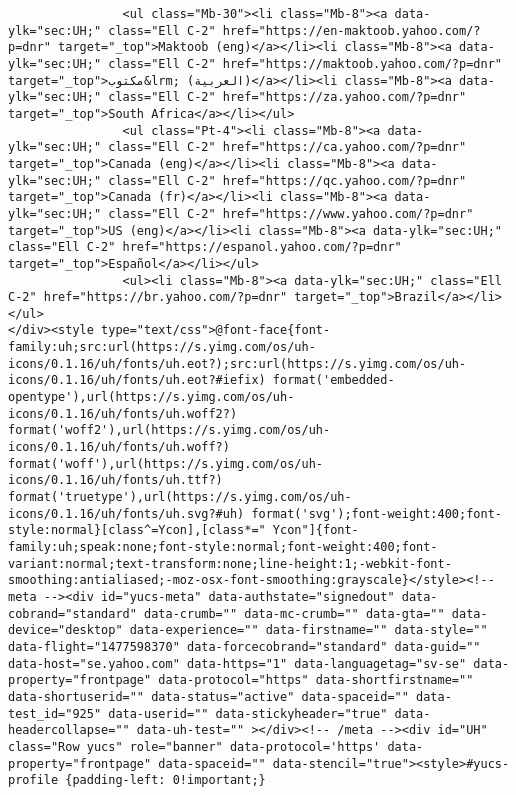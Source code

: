 \begin{verbatim}
                <ul class="Mb-30"><li class="Mb-8"><a data-ylk="sec:UH;" class="Ell C-2" href="https://en-maktoob.yahoo.com/?p=dnr" target="_top">Maktoob (eng)</a></li><li class="Mb-8"><a data-ylk="sec:UH;" class="Ell C-2" href="https://maktoob.yahoo.com/?p=dnr" target="_top">مكتوب&lrm; (العربية)</a></li><li class="Mb-8"><a data-ylk="sec:UH;" class="Ell C-2" href="https://za.yahoo.com/?p=dnr" target="_top">South Africa</a></li></ul>
                <ul class="Pt-4"><li class="Mb-8"><a data-ylk="sec:UH;" class="Ell C-2" href="https://ca.yahoo.com/?p=dnr" target="_top">Canada (eng)</a></li><li class="Mb-8"><a data-ylk="sec:UH;" class="Ell C-2" href="https://qc.yahoo.com/?p=dnr" target="_top">Canada (fr)</a></li><li class="Mb-8"><a data-ylk="sec:UH;" class="Ell C-2" href="https://www.yahoo.com/?p=dnr" target="_top">US (eng)</a></li><li class="Mb-8"><a data-ylk="sec:UH;" class="Ell C-2" href="https://espanol.yahoo.com/?p=dnr" target="_top">Español</a></li></ul>
                <ul><li class="Mb-8"><a data-ylk="sec:UH;" class="Ell C-2" href="https://br.yahoo.com/?p=dnr" target="_top">Brazil</a></li></ul>
</div><style type="text/css">@font-face{font-family:uh;src:url(https://s.yimg.com/os/uh-icons/0.1.16/uh/fonts/uh.eot?);src:url(https://s.yimg.com/os/uh-icons/0.1.16/uh/fonts/uh.eot?#iefix) format('embedded-opentype'),url(https://s.yimg.com/os/uh-icons/0.1.16/uh/fonts/uh.woff2?) format('woff2'),url(https://s.yimg.com/os/uh-icons/0.1.16/uh/fonts/uh.woff?) format('woff'),url(https://s.yimg.com/os/uh-icons/0.1.16/uh/fonts/uh.ttf?) format('truetype'),url(https://s.yimg.com/os/uh-icons/0.1.16/uh/fonts/uh.svg?#uh) format('svg');font-weight:400;font-style:normal}[class^=Ycon],[class*=" Ycon"]{font-family:uh;speak:none;font-style:normal;font-weight:400;font-variant:normal;text-transform:none;line-height:1;-webkit-font-smoothing:antialiased;-moz-osx-font-smoothing:grayscale}</style><!-- meta --><div id="yucs-meta" data-authstate="signedout" data-cobrand="standard" data-crumb="" data-mc-crumb="" data-gta="" data-device="desktop" data-experience="" data-firstname="" data-style="" data-flight="1477598370" data-forcecobrand="standard" data-guid="" data-host="se.yahoo.com" data-https="1" data-languagetag="sv-se" data-property="frontpage" data-protocol="https" data-shortfirstname="" data-shortuserid="" data-status="active" data-spaceid="" data-test_id="925" data-userid="" data-stickyheader="true" data-headercollapse="" data-uh-test="" ></div><!-- /meta --><div id="UH" class="Row yucs" role="banner" data-protocol='https' data-property="frontpage" data-spaceid="" data-stencil="true"><style>#yucs-profile {padding-left: 0!important;}

\end{verbatim}
